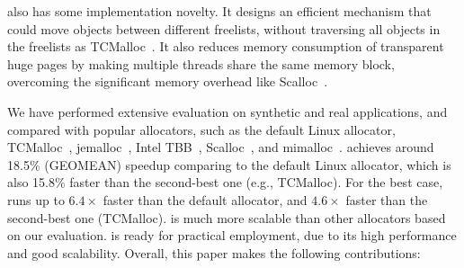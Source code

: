  
\NM{} also has some implementation novelty. 
It designs an efficient mechanism that could move objects between different freelists, without traversing all objects in the freelists as TCMalloc~\cite{tcmalloc}. 
It also reduces memory consumption of transparent huge pages by making multiple threads share the same memory block, overcoming the significant memory overhead like Scalloc~\cite{Scalloc}. 

We have performed extensive evaluation on synthetic and real applications, and compared \NM{} with popular allocators, such as the default Linux allocator, TCMalloc~\cite{tcmalloc}, jemalloc~\cite{jemalloc}, Intel TBB~\cite{tbb}, Scalloc~\cite{Scalloc}, and mimalloc~\cite{mimalloc}. \NM{} achieves around 18.5\%  (GEOMEAN) speedup comparing to the default Linux allocator, which is also 15.8\% faster than the second-best one (e.g., TCMalloc). For the best case, \NM{} runs up to $6.4\times$ faster than the default allocator, and $4.6\times$ faster than the second-best one (TCMalloc). \NM{} is much more scalable than other allocators based on our evaluation. \NM{} is ready for practical employment, due to its high performance and good scalability. Overall, this paper makes the following contributions:

